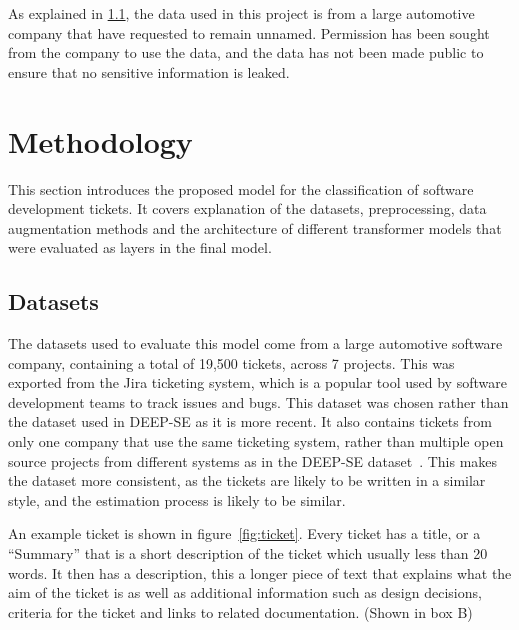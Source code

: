 \documentclass{UoYCSproject}
\begin{document}
    As explained in \ref{sec:datasets}, the data used in this project is from a large automotive company that have requested to remain unnamed.
    Permission has been sought from the company to use the data, and the data has not been made public to ensure that no sensitive information is leaked.


    \chapter{Methodology}
    \label{ch:methodology}
    This section introduces the proposed model for the classification of software development tickets.
    It covers explanation of the datasets, preprocessing, data augmentation methods and the architecture of different transformer models that were evaluated as layers in the final model.

    \section{Datasets}\label{sec:datasets}
    The datasets used to evaluate this model come from a large automotive software company, containing a total of 19,500 tickets, across 7 projects.
    This was exported from the Jira ticketing system, which is a popular tool used by software development teams to track issues and bugs.
    This dataset was chosen rather than the dataset used in DEEP-SE as it is more recent. It also contains tickets from only one company that use the same ticketing system, rather than multiple open source projects from different systems as in the DEEP-SE dataset~\cite{8255666}. This makes the dataset more consistent, as the tickets are likely to be written in a similar style, and the estimation process is likely to be similar. \par
    An example ticket is shown in figure~\ref{fig:ticket}.
    Every ticket has a title, or a ``Summary'' that is a short description of the ticket which usually less than 20 words.
    It then has a description, this a longer piece of text that explains what the aim of the ticket is as well as additional information such as design decisions, criteria for the ticket and links to related documentation. (Shown in box B) \par
\end{document}
